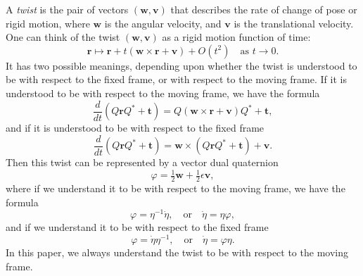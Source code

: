 \documentclass[reqno,12pt]{amsart}
\begin{document}
A \emph{twist} is the pair of vectors $(\bm w, \bm v)$ that describes the rate of change of pose or rigid motion, where $\bm w$ is the angular velocity, and $\bm v$ is the translational velocity.  One can think of the twist $(\bm w, \bm v)$ as a rigid motion function of time:
\begin{equation}
\bm r \mapsto \bm r + t (\bm w \times \bm r + \bm v) + O(t^2) \quad \text{as $t \to 0$} .
\end{equation}
It has two possible meanings, depending upon whether the twist is understood to be with respect to the fixed frame, or with respect to the moving frame.  If it is understood to be with respect to the moving frame, we have the formula
\begin{equation}
\label{ode twist}
\frac d{dt} (Q \bm r Q^* + \bm t) = Q (\bm w \times \bm r + \bm v) Q^* + \bm t,
\end{equation}
and if it is understood to be with respect to the fixed frame
\begin{equation}
\label{ode twist fixed}
\frac d{dt} (Q \bm r Q^* + \bm t) = \bm w \times (Q \bm r Q^* + \bm t) + \bm v .
\end{equation}
Then this twist can be represented by a vector dual quaternion \cite{adorno, agrawal}
\begin{equation}
\label{twist as dual quaternion}
\varphi = \tfrac12 \bm w + \tfrac12 \epsilon \bm v ,
\end{equation}
where if we understand it to be with respect to the moving frame, we have the formula
\begin{equation}
\label{ode dual quaternion}
\varphi = \eta^{-1} \dot \eta, \quad\text{or}\quad\dot \eta = \eta \varphi ,
\end{equation}
and if we understand it to be with respect to the fixed frame
\begin{equation}
\label{ode dual quaternion fixed}
\varphi = \dot \eta \eta^{-1}, \quad\text{or}\quad\dot \eta = \varphi \eta .
\end{equation}
In this paper, we always understand the twist to be with respect to the moving frame.
\end{document}
